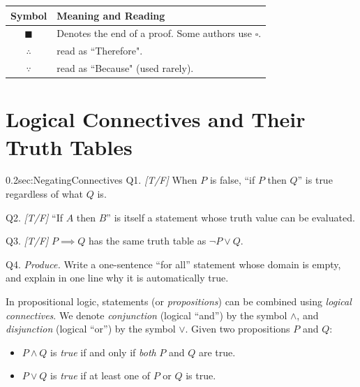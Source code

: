 \begin{center}
\begin{tabular}{|c|l|}
    \hline
    \textbf{Symbol} & \textbf{Meaning and Reading} \\
    \hline
    $\blacksquare$ & Denotes the end of a proof. Some authors use $\square$. \index{$\blacksquare$}\\
    $\therefore$ & read as ``Therefore". \index{$\therefore$}\\
    $\because$ & read as ``Because" (used rarely). \index{$\because$} \\
    \hline
\end{tabular}
\end{center}
\newpage
\section{Logical Connectives and Their Truth Tables}
\label{sec:LogicalConnectives}

\begin{selfcheckbox}{0.2}{sec:NegatingConnectives}
  \hypertarget{q:ch0:truthtables}{}
  Q1. \textit{[T/F]} When $P$ is false, ``if $P$ then $Q$'' is true regardless of what $Q$ is.\par\smallskip
  Q2. \textit{[T/F]} ``If $A$ then $B$'' is itself a statement whose truth value can be evaluated.\par\smallskip
  Q3. \textit{[T/F]} $P \implies Q$ has the same truth table as $\lnot P \lor Q$.\par\smallskip
  Q4. \textit{Produce.} Write a one-sentence ``for all'' statement whose domain is empty, and explain in one line why it is automatically true.
  \par\medskip\hfill{}
\end{selfcheckbox}

In propositional logic, statements (or \textit{propositions}) can be combined using
\textit{logical connectives}. We denote \textit{conjunction} (logical ``and'') by the symbol $\land$,
and \textit{disjunction} (logical ``or'') by the symbol $\lor$.
Given two propositions $P$ and $Q$:

\begin{itemize}
    \item $P \land Q$ is \textit{true} if and only if \textit{both} $P$ and $Q$ are true.
    \item $P \lor Q$ is \textit{true} if at least one of $P$ or $Q$ is true.
\end{itemize}

